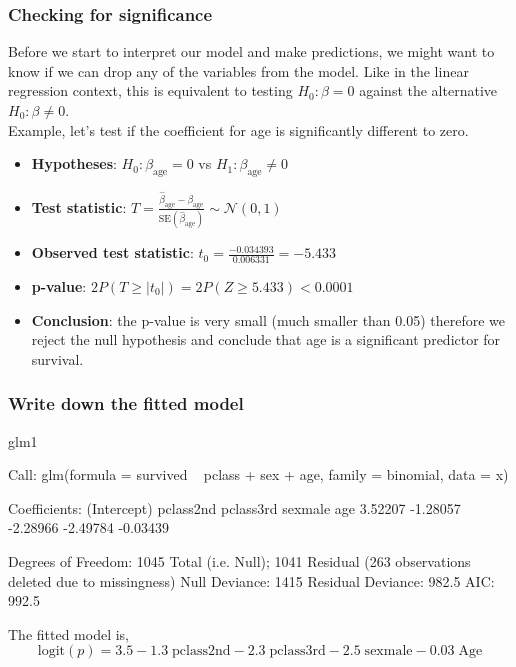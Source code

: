 \documentclass[a4paper]{article}\usepackage[]{graphicx}\usepackage[]{xcolor}
\begin{document}
\subsubsection{Checking for significance}
Before we start to interpret our model and make predictions, we might want to know if we can drop any of the variables from the model. Like in the linear regression context, this is equivalent to testing \( H_0: \beta = 0 \) against the alternative \( H_0: \beta \neq 0 \).\\
Example, let's test if the coefficient for age is significantly different to zero.
\begin{itemize}
	\item \textbf{Hypotheses}: \( H_0: \beta_{\text{age}} = 0 \) vs \( H_1: \beta_{\text{age}} \neq 0 \)
	\item \textbf{Test statistic}: \( T = \frac{\hat{\beta}_\text{age} - \beta_\text{age}}{\text{SE}(\hat{\beta}_\text{age})} \sim \mathcal{N}(0,1) \)
	\item \textbf{Observed test statistic}: \( t_0 = \frac{-0.034393}{0.006331} = -5.433 \) 
	\item \textbf{p-value}: \( 2P(T \geq \lvert t_0 \rvert) = 2P(Z \geq 5.433) <0.0001 \)
	\item \textbf{Conclusion}: the p-value is very small (much smaller than 0.05) therefore we reject the null hypothesis and conclude that age is a significant predictor for survival.
\end{itemize}
\subsubsection{Write down the fitted model}
\begin{Schunk}
\begin{Sinput}
glm1
\end{Sinput}
\begin{Soutput}

Call:  glm(formula = survived ~ pclass + sex + age, family = binomial, 
    data = x)

Coefficients:
(Intercept)    pclass2nd    pclass3rd      sexmale          age  
    3.52207     -1.28057     -2.28966     -2.49784     -0.03439  

Degrees of Freedom: 1045 Total (i.e. Null);  1041 Residual
  (263 observations deleted due to missingness)
Null Deviance:	    1415 
Residual Deviance: 982.5 	AIC: 992.5
\end{Soutput}
\end{Schunk}
The fitted model is,
\[
	\text{logit}(p) = 3.5 - 1.3\;\text{pclass2nd} - 2.3\;\text{pclass3rd} - 2.5\;\text{sexmale} - 0.03\;\text{Age}
\]
\end{document}
